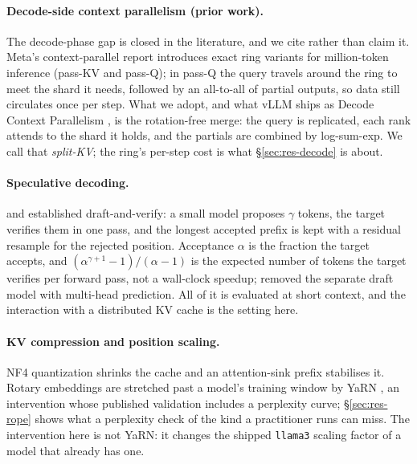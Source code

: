 \documentclass{article}
\begin{document}
\paragraph{Decode-side context parallelism (prior work).} The decode-phase gap is closed in
the literature, and we cite rather than claim it. Meta's context-parallel report
\citep{yang2024contextparallelism} introduces exact ring variants for million-token inference
(pass-KV and pass-Q); in pass-Q the query travels around the ring to meet the shard it needs,
followed by an all-to-all of partial outputs, so data still circulates once per step. What we
adopt, and what vLLM ships as Decode Context Parallelism \citep{lee2026dcp}, is the
rotation-free merge: the query is replicated, each rank attends to the shard it holds, and the
partials are combined by log-sum-exp. We call that \emph{split-KV}; the ring's per-step cost
is what \S\ref{sec:res-decode} is about.

\paragraph{Speculative decoding.} \citet{leviathan2023fast} and \citet{chen2023accelerating}
established draft-and-verify: a small model proposes $\gamma$ tokens, the target verifies them
in one pass, and the longest accepted prefix is kept with a residual resample for the rejected
position. Acceptance $\alpha$ is the fraction the target accepts, and $(\alpha^{\gamma+1} -
1)/(\alpha - 1)$ is the expected number of tokens the target verifies per forward pass, not a
wall-clock speedup; \citet{cai2024medusa} removed the separate draft model with multi-head
prediction. All of it is evaluated at short context, and the interaction with a distributed
KV cache is the setting here.

\paragraph{KV compression and position scaling.} NF4 quantization
\citep{dettmers2023qlora} shrinks the cache and an attention-sink prefix
\citep{xiao2024streamingllm} stabilises it. Rotary embeddings \citep{su2024rope} are stretched
past a model's training window by YaRN \citep{peng2023yarn}, an intervention whose published
validation includes a perplexity curve; \S\ref{sec:res-rope} shows what a perplexity check of
the kind a practitioner runs can miss. The intervention here is not
YaRN: it changes the shipped \texttt{llama3} scaling factor of a model that already has one.
\end{document}
